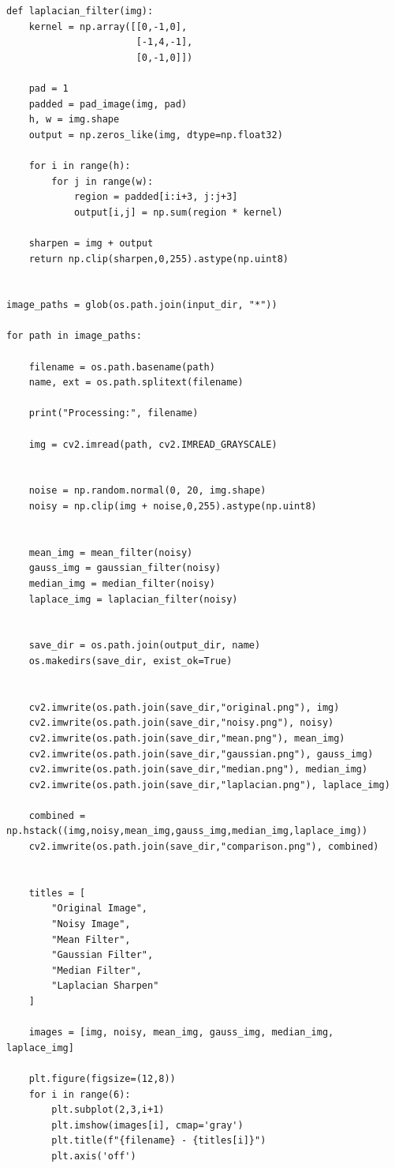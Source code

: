 \documentclass[a4paper,12pt]{article}
\begin{document}
\begin{lstlisting}
def laplacian_filter(img):
    kernel = np.array([[0,-1,0],
                       [-1,4,-1],
                       [0,-1,0]])

    pad = 1
    padded = pad_image(img, pad)
    h, w = img.shape
    output = np.zeros_like(img, dtype=np.float32)

    for i in range(h):
        for j in range(w):
            region = padded[i:i+3, j:j+3]
            output[i,j] = np.sum(region * kernel)

    sharpen = img + output
    return np.clip(sharpen,0,255).astype(np.uint8)


image_paths = glob(os.path.join(input_dir, "*"))

for path in image_paths:

    filename = os.path.basename(path)
    name, ext = os.path.splitext(filename)

    print("Processing:", filename)

    img = cv2.imread(path, cv2.IMREAD_GRAYSCALE)


    noise = np.random.normal(0, 20, img.shape)
    noisy = np.clip(img + noise,0,255).astype(np.uint8)


    mean_img = mean_filter(noisy)
    gauss_img = gaussian_filter(noisy)
    median_img = median_filter(noisy)
    laplace_img = laplacian_filter(noisy)


    save_dir = os.path.join(output_dir, name)
    os.makedirs(save_dir, exist_ok=True)


    cv2.imwrite(os.path.join(save_dir,"original.png"), img)
    cv2.imwrite(os.path.join(save_dir,"noisy.png"), noisy)
    cv2.imwrite(os.path.join(save_dir,"mean.png"), mean_img)
    cv2.imwrite(os.path.join(save_dir,"gaussian.png"), gauss_img)
    cv2.imwrite(os.path.join(save_dir,"median.png"), median_img)
    cv2.imwrite(os.path.join(save_dir,"laplacian.png"), laplace_img)

    combined = np.hstack((img,noisy,mean_img,gauss_img,median_img,laplace_img))
    cv2.imwrite(os.path.join(save_dir,"comparison.png"), combined)


    titles = [
        "Original Image",
        "Noisy Image",
        "Mean Filter",
        "Gaussian Filter",
        "Median Filter",
        "Laplacian Sharpen"
    ]

    images = [img, noisy, mean_img, gauss_img, median_img, laplace_img]

    plt.figure(figsize=(12,8))
    for i in range(6):
        plt.subplot(2,3,i+1)
        plt.imshow(images[i], cmap='gray')
        plt.title(f"{filename} - {titles[i]}")
        plt.axis('off')


\end{lstlisting}
\end{document}
